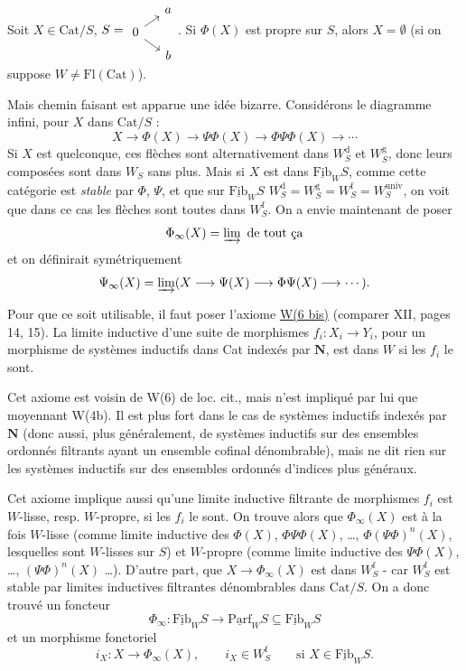 \documentclass[11pt]{article}
\newcommand{\printedpage}[1]{\marginpar{\footnotesize p.~#1}}
\newcommand{\msp}[1]{\marginpar{\footnotesize [#1]}}
\newcommand{\und}[1]{\underline{\mathrm{#1}}}
\begin{document}
\printedpage{119}

\noindent\llap{$|||$\quad}Soit $X \in \mathrm{Cat}/S$, $S = \begin{tikzcd}[row sep=tiny, column sep=small] & a \\ 0 \arrow[ur] \arrow[dr] & \\ & b \end{tikzcd}$. Si $\Phi(X)$ est propre sur $S$, alors $X = \emptyset$ (si on suppose $W \neq \mathrm{Fl}(\mathrm{Cat})$).

Mais chemin faisant est apparue une idée bizarre. Considérons le diagramme infini, pour $X$ dans $\mathrm{Cat}/S$ :
\[
X \longrightarrow \Phi(X) \longrightarrow \Psi\Phi(X) \longrightarrow \Phi\Psi\Phi(X) \longrightarrow \cdots
\]
Si $X$ est quelconque, ces flèches sont alternativement dans $W_S^{\mathrm{d}}$ et $W_S^{\mathrm{g}}$, donc leurs composées sont dans $W_S$ sans plus. Mais si $X$ est dans $\und{Fib}_W S$, comme cette catégorie est \textit{stable} par $\Phi$, $\Psi$, et que sur $\und{Fib}_W S$ $W_S^{\mathrm{d}} = W_S^{\mathrm{g}} = W_S^{\mathrm{f}} = W_S^{\mathrm{univ}}$, on voit que dans ce cas les flèches sont toutes dans $W_S^{\mathrm{f}}$. On a envie maintenant de poser
\[
\Phi_\infty(X) = \varinjlim \text{ de tout ça}
\]
\msp{page 193}
et on définirait symétriquement
\[
\Psi_\infty(X) = \varinjlim (X \longrightarrow \Psi(X) \longrightarrow \Phi\Psi(X) \longrightarrow \cdots).
\]

Pour que ce soit utilisable, il faut poser l'axiome \underline{W(6 bis)} (comparer XII, pages 14, 15). La limite inductive d'une suite de morphismes $f_i : X_i \longrightarrow Y_i$, pour un morphisme de systèmes inductifs dans Cat indexés par $\mathbf{N}$, est dans $W$ si les $f_i$ le sont.

Cet axiome est voisin de W(6) de loc. cit., mais n'est impliqué par lui que moyennant W(4b). Il est plus fort dans le cas de systèmes inductifs indexés par $\mathbf{N}$ (donc aussi, plus généralement, de systèmes inductifs sur des ensembles ordonnés filtrants ayant un ensemble cofinal dénombrable), mais ne dit rien sur les systèmes inductifs sur des ensembles ordonnés d'indices plus généraux.

Cet axiome implique aussi qu'une limite inductive filtrante de morphismes $f_i$ est $W$-lisse, resp. $W$-propre, si les $f_i$ le sont. On trouve alors que $\Phi_\infty(X)$ est à la fois $W$-lisse (comme limite inductive des $\Phi(X)$, $\Phi\Psi\Phi(X)$, \ldots, $\Phi(\Psi\Phi)^n(X)$, lesquelles sont $W$-lisses sur $S$) et $W$-propre (comme limite inductive des $\Psi\Phi(X)$, \ldots, $(\Psi\Phi)^n(X)$ \ldots). D'autre part, que $X \longrightarrow \Phi_\infty(X)$ est dans $W_S^{\mathrm{f}}$ - car $W_S^{\mathrm{f}}$ est stable par limites inductives filtrantes dénombrables dans $\mathrm{Cat}/S$. On a donc trouvé un foncteur
\msp{page 194}
\[
\Phi_\infty : \und{Fib}_W S \longrightarrow \und{Parf}_W S \subseteq \und{Fib}_W S
\]
et un morphisme fonctoriel
\[
i_X : X \longrightarrow \Phi_\infty(X), \qquad \boxed{i_X \in W_S^{\mathrm{f}}} \qquad \text{si } X \in \und{Fib}_W S.
\]
\end{document}
